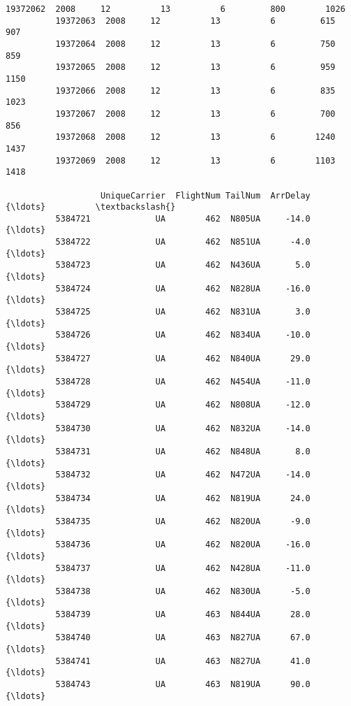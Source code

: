 \documentclass[11pt]{article}
\begin{document}
\begin{Verbatim}[commandchars=\\\{\}]
          19372062  2008     12          13          6         800        1026   
          19372063  2008     12          13          6         615         907   
          19372064  2008     12          13          6         750         859   
          19372065  2008     12          13          6         959        1150   
          19372066  2008     12          13          6         835        1023   
          19372067  2008     12          13          6         700         856   
          19372068  2008     12          13          6        1240        1437   
          19372069  2008     12          13          6        1103        1418   
          
                   UniqueCarrier  FlightNum TailNum  ArrDelay        {\ldots}          \textbackslash{}
          5384721             UA        462  N805UA     -14.0        {\ldots}           
          5384722             UA        462  N851UA      -4.0        {\ldots}           
          5384723             UA        462  N436UA       5.0        {\ldots}           
          5384724             UA        462  N828UA     -16.0        {\ldots}           
          5384725             UA        462  N831UA       3.0        {\ldots}           
          5384726             UA        462  N834UA     -10.0        {\ldots}           
          5384727             UA        462  N840UA      29.0        {\ldots}           
          5384728             UA        462  N454UA     -11.0        {\ldots}           
          5384729             UA        462  N808UA     -12.0        {\ldots}           
          5384730             UA        462  N832UA     -14.0        {\ldots}           
          5384731             UA        462  N848UA       8.0        {\ldots}           
          5384732             UA        462  N472UA     -14.0        {\ldots}           
          5384734             UA        462  N819UA      24.0        {\ldots}           
          5384735             UA        462  N820UA      -9.0        {\ldots}           
          5384736             UA        462  N820UA     -16.0        {\ldots}           
          5384737             UA        462  N428UA     -11.0        {\ldots}           
          5384738             UA        462  N830UA      -5.0        {\ldots}           
          5384739             UA        463  N844UA      28.0        {\ldots}           
          5384740             UA        463  N827UA      67.0        {\ldots}           
          5384741             UA        463  N827UA      41.0        {\ldots}           
          5384743             UA        463  N819UA      90.0        {\ldots}           

\end{Verbatim}
\end{document}
